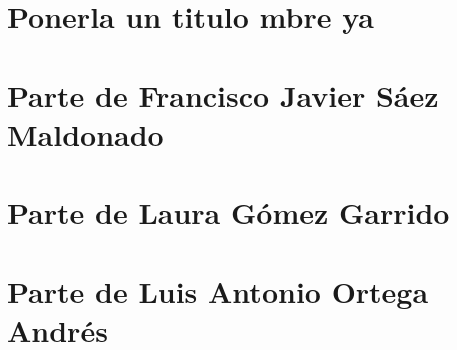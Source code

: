 \documentclass[11pt]{article}
\begin{document}
\section{Ponerla un titulo mbre ya}

\section{Parte de Francisco Javier Sáez Maldonado}

 \newpage

\section{Parte de Laura Gómez Garrido} 

 \newpage

\section{Parte de Luis Antonio Ortega Andrés}

 
 
 
 
 
 
\end{document}
